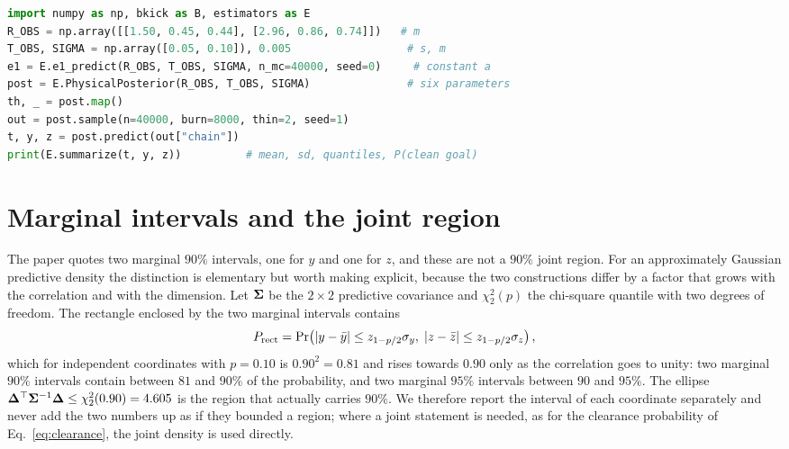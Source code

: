 \begin{lstlisting}[language=Python,caption={Core of the reproduction script
\texttt{code/predict.py} (abridged to the two estimator calls and the outcome
count; the full file ships with the paper and prints every number quoted in
Sections~\ref{sec:results} and~\ref{sec:conclusion}).}]
import numpy as np, bkick as B, estimators as E
R_OBS = np.array([[1.50, 0.45, 0.44], [2.96, 0.86, 0.74]])   # m
T_OBS, SIGMA = np.array([0.05, 0.10]), 0.005                  # s, m
e1 = E.e1_predict(R_OBS, T_OBS, SIGMA, n_mc=40000, seed=0)     # constant a
post = E.PhysicalPosterior(R_OBS, T_OBS, SIGMA)               # six parameters
th, _ = post.map()
out = post.sample(n=40000, burn=8000, thin=2, seed=1)
t, y, z = post.predict(out["chain"])
print(E.summarize(t, y, z))          # mean, sd, quantiles, P(clean goal)
\end{lstlisting}

\section{Marginal intervals and the joint region}
\label{app:joint}

The paper quotes two marginal $90\%$ intervals, one for $y$ and one for $z$, and
these are not a $90\%$ joint region. For an approximately Gaussian predictive
density the distinction is elementary but worth making explicit, because the two
constructions differ by a factor that grows with the correlation and with the
dimension. Let $\bm{\Sigma}$ be the $2\times2$ predictive covariance and
$\chi^2_{2}(p)$ the chi-square quantile with two degrees of freedom. The
rectangle enclosed by the two marginal intervals contains
\begin{equation}
  P_{\rm rect}=\Pr\!\left(|y-\bar y|\le z_{1-p/2}\sigma_y,\;
                        |z-\bar z|\le z_{1-p/2}\sigma_z\right),
  \label{eq:rect}
\end{equation}
which for independent coordinates with $p=0.10$ is $0.90^2=0.81$ and rises
towards $0.90$ only as the correlation goes to unity: two marginal $90\%$
intervals contain between $81$ and $90\%$ of the probability, and two marginal
$95\%$ intervals between $90$ and $95\%$. The ellipse
$\bm{\Delta}^{\top}\bm{\Sigma}^{-1}\bm{\Delta}\le\chi^2_2(0.90)=4.605$ is the
region that actually carries $90\%$. We therefore report the interval of each
coordinate separately and never add the two numbers up as if they bounded a
region; where a joint statement is needed, as for the clearance probability of
Eq.~\eqref{eq:clearance}, the joint density is used directly.

